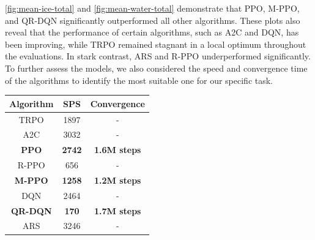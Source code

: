 \noindent \textcolor{deepblue}{\autoref{fig:mean-ice-total}} and \textcolor{deepblue}{\autoref{fig:mean-water-total}} demonstrate that PPO, M-PPO, and QR-DQN significantly outperformed all other algorithms. These plots also reveal that the performance of certain algorithms, such as A2C and DQN, has been improving, while TRPO remained stagnant in a local optimum throughout the evaluations. In stark contrast, ARS and R-PPO underperformed significantly. To further assess the models, we also considered the speed and convergence time of the algorithms to identify the most suitable one for our specific task.

\bigskip

\begin{minipage}[htbp]{0.45\textwidth}
    \centering
    \begin{tabular}{|c|c|c|}
        \hline
        \textbf{Algorithm} & \textbf{SPS} & \textbf{Convergence} \\
        \hline
        TRPO  & 1897  &  - \\
        A2C &  3032 & - \\
        \textbf{PPO}    &  \textbf{2742} & \textbf{1.6M steps} \\
        R-PPO   & 656 & - \\
        \textbf{M-PPO}  & \textbf{1258} & \textbf{1.2M steps} \\
        DQN  &  2464 & - \\
        \textbf{QR-DQN}   & \textbf{170} & \textbf{1.7M steps}\\
        ARS  & 3246 & - \\
        \hline
    \end{tabular}
    \captionsetup{justification=justified, singlelinecheck=false, width=1\linewidth, labelfont=bf} 
    \label{tab:single-agent-results-conv}
\end{minipage}%
\hfill
